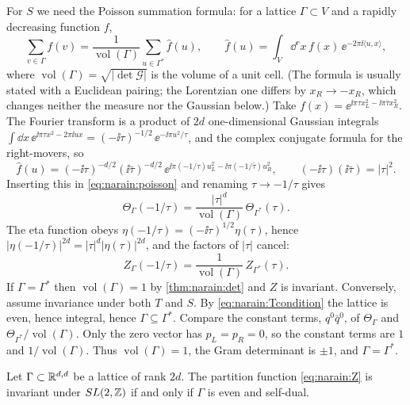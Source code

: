 For $S$ we need the Poisson summation formula: for a lattice
$\Gamma\subset V$ and a rapidly decreasing function $f$,
\begin{equation}\label{eq:narain:poisson}
 \sum_{v\in\Gamma}f(v)=\frac1{\operatorname{vol}(\Gamma)}\sum_{u\in\Gamma^*}\hat f(u),\qquad
 \hat f(u)=\int_V\dd^{r}x\,f(x)\,\ee^{-2\pi\ii\langle u,x\rangle},
\end{equation}
where $\operatorname{vol}(\Gamma)=\sqrt{|\det\mathcal G|}$ is the volume of a unit cell. (The
formula is usually stated with a Euclidean pairing; the Lorentzian one differs by
$x_R\to-x_R$, which changes neither the measure nor the Gaussian below.) Take
$f(x)=\ee^{\ii\pi\tau x_L^2-\ii\pi\bar\tau x_R^2}$. The Fourier transform is a product of $2d$
one-dimensional Gaussian integrals
$\int\dd x\,\ee^{\ii\pi\tau x^2-2\pi\ii ux}=(-\ii\tau)^{-1/2}\,\ee^{-\ii\pi u^2/\tau}$, and the
complex conjugate formula for the right-movers, so
\[
 \hat f(u)=(-\ii\tau)^{-d/2}(\ii\bar\tau)^{-d/2}\,
 \ee^{\ii\pi(-1/\tau)u_L^2-\ii\pi(-1/\bar\tau)u_R^2},\qquad
 (-\ii\tau)(\ii\bar\tau)=|\tau|^2 .
\]
Inserting this in \eqref{eq:narain:poisson} and renaming $\tau\to-1/\tau$ gives
\begin{equation}\label{eq:narain:thetaS}
 \Theta_\Gamma(-1/\tau)=\frac{|\tau|^{d}}{\operatorname{vol}(\Gamma)}\,\Theta_{\Gamma^*}(\tau).
\end{equation}
The eta function obeys $\eta(-1/\tau)=(-\ii\tau)^{1/2}\eta(\tau)$, hence
$|\eta(-1/\tau)|^{2d}=|\tau|^{d}|\eta(\tau)|^{2d}$, and the factors of $|\tau|$ cancel:
\begin{equation}\label{eq:narain:ZS}
 Z_\Gamma(-1/\tau)=\frac1{\operatorname{vol}(\Gamma)}\,Z_{\Gamma^*}(\tau).
\end{equation}
If $\Gamma=\Gamma^*$ then $\operatorname{vol}(\Gamma)=1$ by \cref{thm:narain:det} and $Z$ is
invariant. Conversely, assume invariance under both $T$ and $S$. By
\eqref{eq:narain:Tcondition} the lattice is even, hence integral, hence
$\Gamma\subseteq\Gamma^*$. Compare the constant terms, $q^0\bar q^0$, of
$\Theta_\Gamma$ and $\Theta_{\Gamma^*}/\operatorname{vol}(\Gamma)$. Only the zero vector has
$p_L=p_R=0$, so the constant terms are $1$ and $1/\operatorname{vol}(\Gamma)$. Thus
$\operatorname{vol}(\Gamma)=1$, the Gram determinant is $\pm1$, and $\Gamma=\Gamma^*$.

\begin{theorem}[\TL]\label{thm:narain:modular}
Let $\Gamma\subset\mathbb{R}^{d,d}$ be a lattice of rank $2d$. The partition function
\eqref{eq:narain:Z} is invariant under $SL(2,\mathbb{Z})$ if and only if $\Gamma$ is even and self-dual.
\end{theorem}


